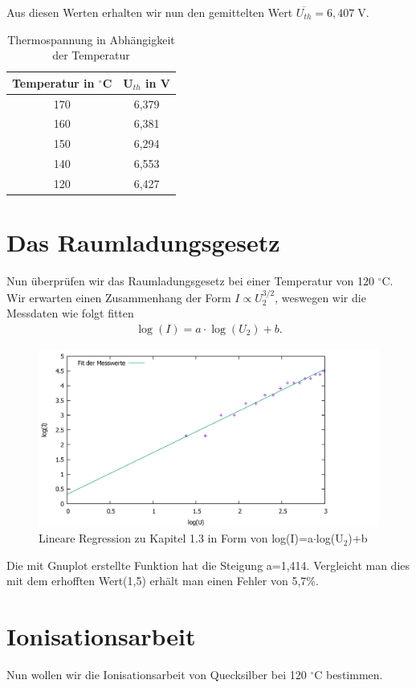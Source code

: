 Aus diesen Werten erhalten wir nun den gemittelten Wert $ \overline{U_{th}} =6,407\; $V.
\begin{table}
	\centering
	\caption {Thermospannung in Abhängigkeit der Temperatur}
	\begin{tabular}{|c|c|}
		\hline
		Temperatur in $^\circ$C & U$_{th}$ in V \\ \hline
		170           &     6,379     \\ \hline
		160           &     6,381     \\ \hline
		150           &     6,294     \\ \hline
		140           &     6,553     \\ \hline
		120           &     6,427     \\ \hline
	\end{tabular} 
\end{table}
\section{Das Raumladungsgesetz}
Nun überprüfen wir das Raumladungsgesetz bei einer Temperatur von 120 $ ^\circ $C. Wir erwarten einen Zusammenhang der Form $I\propto U_{2}^{3/2}  $, weswegen wir die Messdaten wie folgt fitten
\begin{align*}
\log(I)=a\cdot \log(U_{2})+b\text{.}
\end{align*}
\begin{figure}
	\includegraphics[width=\textwidth]{../Daten/Aufgabe1/Aufgabe1_3.png}
	\caption{Lineare Regression zu Kapitel 1.3 in Form von log(I)=a$ \cdot $log(U$ _2 $)+b}
\end{figure}
Die mit Gnuplot erstellte Funktion hat die Steigung a=1,414. Vergleicht man dies mit dem erhofften Wert(1,5) erhält man einen Fehler von 5,7\%.

\section{Ionisationsarbeit}
Nun wollen wir die Ionisationsarbeit von Quecksilber bei 120 $ ^\circ $C bestimmen.

